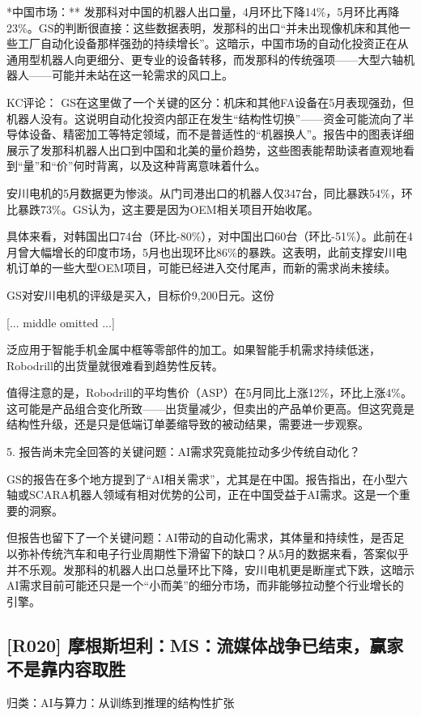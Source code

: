 \documentclass[11pt]{ctexart}
\begin{document}
*中国市场：** 发那科对中国的机器人出口量，4月环比下降14\%，5月环比再降23\%。GS的判断很直接：这些数据表明，发那科的出口“并未出现像机床和其他一些工厂自动化设备那样强劲的持续增长”。这暗示，中国市场的自动化投资正在从通用型机器人向更细分、更专业的设备转移，而发那科的传统强项——大型六轴机器人——可能并未站在这一轮需求的风口上。

KC评论： GS在这里做了一个关键的区分：机床和其他FA设备在5月表现强劲，但机器人没有。这说明自动化投资内部正在发生“结构性切换”——资金可能流向了半导体设备、精密加工等特定领域，而不是普适性的“机器换人”。报告中的图表详细展示了发那科机器人出口到中国和北美的量价趋势，这些图表能帮助读者直观地看到“量”和“价”何时背离，以及这种背离意味着什么。

安川电机的5月数据更为惨淡。从门司港出口的机器人仅347台，同比暴跌54\%，环比暴跌73\%。GS认为，这主要是因为OEM相关项目开始收尾。

具体来看，对韩国出口74台（环比-80\%），对中国出口60台（环比-51\%）。此前在4月曾大幅增长的印度市场，5月也出现环比86\%的暴跌。这表明，此前支撑安川电机订单的一些大型OEM项目，可能已经进入交付尾声，而新的需求尚未接续。

GS对安川电机的评级是买入，目标价9,200日元。这份

[... middle omitted ...]

泛应用于智能手机金属中框等零部件的加工。如果智能手机需求持续低迷，Robodrill的出货量就很难看到趋势性反转。

值得注意的是，Robodrill的平均售价（ASP）在5月同比上涨12\%，环比上涨4\%。这可能是产品组合变化所致——出货量减少，但卖出的产品单价更高。但这究竟是结构性升级，还是只是低端订单萎缩导致的被动结果，需要进一步观察。

5. 报告尚未完全回答的关键问题：AI需求究竟能拉动多少传统自动化？

GS的报告在多个地方提到了“AI相关需求”，尤其是在中国。报告指出，在小型六轴或SCARA机器人领域有相对优势的公司，正在中国受益于AI需求。这是一个重要的洞察。

但报告也留下了一个关键问题：AI带动的自动化需求，其体量和持续性，是否足以弥补传统汽车和电子行业周期性下滑留下的缺口？从5月的数据来看，答案似乎并不乐观。发那科的机器人出口总量环比下降，安川电机更是断崖式下跌，这暗示AI需求目前可能还只是一个“小而美”的细分市场，而非能够拉动整个行业增长的引擎。

\subsection{[R020] 摩根斯坦利：MS：流媒体战争已结束，赢家不是靠内容取胜}
{\small\color{refgray}归类：AI与算力：从训练到推理的结构性扩张}
\end{document}

